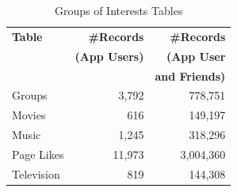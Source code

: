 \begin{table}
\centering
\begin{tabular}{|>{\small}p{2cm}|>{\small}r|>{\small}r|}
\hline
\textbf{Table} & \textbf{\#Records} & \textbf{\#Records} \\
& \textbf{(App Users)} & \textbf{(App User} \\
& & \textbf{and Friends)} \\
\hline
Groups & 3,792 & 778,751 \\
\hline
Movies & 616 & 149,197 \\
\hline
Music & 1,245 & 318,296 \\
\hline
Page Likes & 11,973 & 3,004,360 \\
\hline
Television & 819 & 144,308 \\
\hline
\end{tabular}
\caption{Groups of Interests Tables}
\label{tab:interests}
\end{table}






